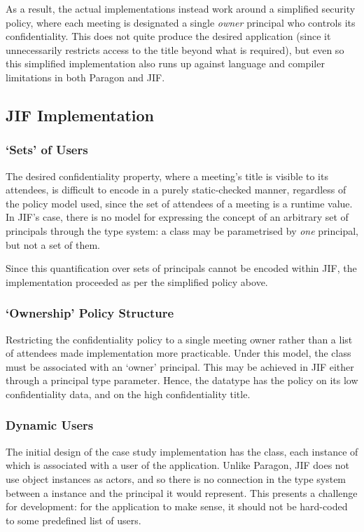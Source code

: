 As a result, the actual implementations instead work around a simplified security policy, where each meeting is designated a single \textit{owner} principal who controls its confidentiality. This does not quite produce the desired application (since it unnecessarily restricts access to the title beyond what is required), but even so this simplified implementation also runs up against language and compiler limitations in both Paragon and JIF.

\subsection{JIF Implementation}

\subsubsection{`Sets' of Users}

The desired confidentiality property, where a meeting's title is visible to its attendees, is difficult to encode in a purely static-checked manner, regardless of the policy model used, since the set of attendees of a meeting is a runtime value. In JIF's case, there is no model for expressing the concept of an arbitrary set of principals through the type system: a class may be parametrised by \textit{one} principal, but not a set of them.

Since this quantification over sets of principals cannot be encoded within JIF, the implementation proceeded as per the simplified policy above.

\subsubsection{`Ownership' Policy Structure}

Restricting the confidentiality policy to a single meeting owner rather than a list of attendees made implementation more practicable. Under this model, the  class must be associated with an `owner' principal. This may be achieved in JIF either through a principal type parameter. Hence, the  datatype has the policy  on its low confidentiality data, and  on the high confidentiality title.

\subsubsection{Dynamic Users}

The initial design of the case study implementation has the  class, each instance of which is associated with a user of the application. Unlike Paragon, JIF does not use object instances as actors, and so there is no connection in the type system between a  instance and the principal it would represent. This presents a challenge for development: for the application to make sense, it should not be hard-coded to some predefined list of users. 

